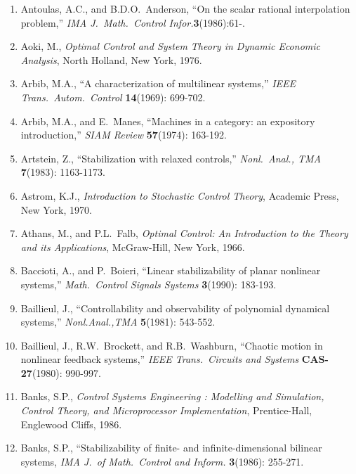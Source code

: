 \begin{enumerate}
\item
Antoulas, A.C., and B.D.O.\ Anderson, ``On the scalar rational interpolation
problem,'' {\it IMA J.\ Math.\ Control Infor.}{\bf 3}(1986):61-.

\item
Aoki, M., {\it Optimal Control and System Theory in Dynamic Economic
Analysis}, North Holland, New York, 1976.

\item
Arbib, M.A., ``A characterization of multilinear systems,'' {\it IEEE Trans.\
Autom.\ Control} {\bf 14}(1969): 699-702.

\item
Arbib, M.A., and E.\ Manes, ``Machines in a category: an expository
introduction,'' {\it SIAM Review} {\bf 57}(1974): 163-192.

\item
Artstein, Z., ``Stabilization with relaxed controls,'' {\it Nonl.\ Anal., TMA}
{\bf 7}(1983): 1163-1173.

\item
Astrom, K.J., {\it Introduction to Stochastic Control Theory}, Academic Press,
New York, 1970.

\item
Athans, M., and P.L.\ Falb, {\it Optimal Control: An Introduction to the
Theory and its Applications}, McGraw-Hill, New York, 1966.

\item
Baccioti, A., and P.\ Boieri, ``Linear stabilizability of planar nonlinear
systems,'' {\it Math.\ Control Signals Systems} {\bf 3}(1990): 183-193.

\item
Baillieul, J., ``Controllability and observability of polynomial dynamical
systems,'' {\it Nonl.Anal.,TMA} {\bf 5}(1981): 543-552.

\item
Baillieul, J., R.W.\ Brockett, and R.B.\ Washburn, ``Chaotic motion in
nonlinear feedback systems,'' {\it IEEE Trans.\ Circuits and Systems} {\bf
CAS-27}(1980): 990-997.

\item
Banks, S.P., {\it Control Systems Engineering : Modelling and Simulation,
Control Theory, and Microprocessor Implementation}, Prentice-Hall, Englewood
Cliffs, 1986.

\item
Banks, S.P., ``Stabilizability of finite- and infinite-dimensional bilinear
systems, {\it IMA J.\ of Math.\ Control and Inform.} {\bf 3}(1986): 255-271.


\end{enumerate}

